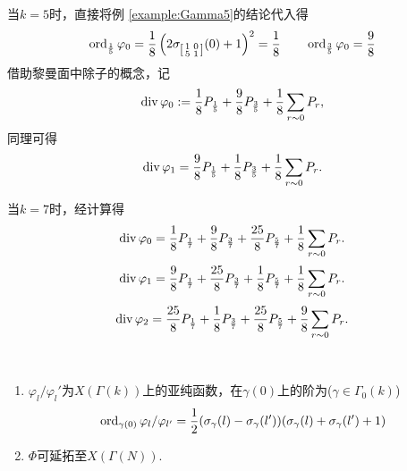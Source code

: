 \begin{example1}
	当$k=5$时，直接将例 \ref{example:Gamma5}的结论代入得
	$$\operatorname{ord}_{\frac{1}{5}}\varphi_0= \frac{1}{8} \left(  2\sigma_{\left[\begin{smallmatrix}
		1 & 0 \\ 5 & 1
		\end{smallmatrix}\right]} (0)+1 \right)^2=\frac{1}{8} \qquad \operatorname{ord}_{\frac{3}{5}}\varphi_0= \frac{9}{8}$$
	借助黎曼面中除子的概念，记
	$$\operatorname{\operatorname{div}} \varphi_0:= \frac{1}{8}P_{\frac{1}{5}}+\frac{9}{8}P_{\frac{3}{5}}+\frac{1}{8} \sum_{r \sim 0}P_r,$$
	同理可得
	$$\operatorname{\operatorname{div}} \varphi_1= \frac{9}{8}P_{\frac{1}{5}}+\frac{1}{8}P_{\frac{3}{5}}+\frac{1}{8} \sum_{r \sim 0}P_r.$$
\end{example1}
\begin{example1}
	当$k=7$时，经计算得
	$$\operatorname{\operatorname{div}} \varphi_0= \frac{1}{8}P_{\frac{1}{7}}+\frac{9}{8}P_{\frac{3}{7}}+\frac{25}{8}P_{\frac{5}{7}}+\frac{1}{8} \sum_{r \sim 0}P_r.$$
	$$\operatorname{\operatorname{div}} \varphi_1= \frac{9}{8}P_{\frac{1}{7}}+\frac{25}{8}P_{\frac{3}{7}}+\frac{1}{8}P_{\frac{5}{7}}+\frac{1}{8} \sum_{r \sim 0}P_r.$$
	$$\operatorname{\operatorname{div}} \varphi_2= \frac{25}{8}P_{\frac{1}{7}}+\frac{1}{8}P_{\frac{3}{7}}+\frac{25}{8}P_{\frac{5}{7}}+\frac{9}{8} \sum_{r \sim 0}P_r.$$
\end{example1}
\begin{corollary}\
	\begin{enumerate}[(1)]
		\item $\varphi_l/\varphi_l'$为$X(\Gamma(k))$上的亚纯函数，在$\gamma(0)$上的阶为($\gamma \in \Gamma_0(k)$)
		$$\operatorname{ord}_{\gamma(0)} \varphi_l/\varphi_{l'} = \frac{1}{2} (\sigma_{\gamma}(l)-\sigma_{\gamma}(l'))(\sigma_{\gamma}(l)+\sigma_{\gamma}(l')+1)$$
		\item $\Phi$可延拓至$X(\Gamma(N))$.
	\end{enumerate}
	
\end{corollary}
